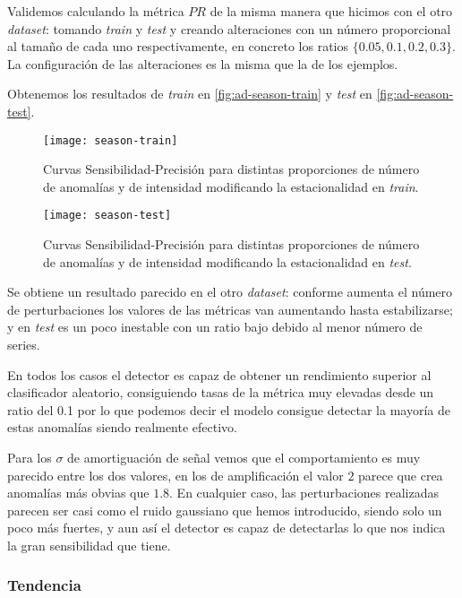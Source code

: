 Validemos calculando la métrica $PR$ de la misma manera que hicimos con el otro \emph{dataset}: tomando \emph{train} y \emph{test} y creando alteraciones con un número proporcional al tamaño de cada uno respectivamente, en concreto los ratios $\{0.05, 0.1, 0.2, 0.3\}$. La configuración de las alteraciones es la misma que la de los ejemplos.

Obtenemos los resultados de \emph{train} en \autoref{fig:ad-season-train} y \emph{test} en \autoref{fig:ad-season-test}.

\begin{figure}[htpb]
  \centering
  \texttt{[image: season-train]}
  \caption{Curvas Sensibilidad-Precisión para distintas proporciones de número de anomalías y de intensidad modificando la estacionalidad en \emph{train}.}
  \label{fig:ad-season-train}
\end{figure}

\begin{figure}[htpb]
  \centering
  \texttt{[image: season-test]}
  \caption{Curvas Sensibilidad-Precisión para distintas proporciones de número de anomalías y de intensidad modificando la estacionalidad en \emph{test}.}
  \label{fig:ad-season-test}
\end{figure}

Se obtiene un resultado parecido en el otro \emph{dataset}: conforme aumenta el número de perturbaciones los valores de las métricas van aumentando hasta estabilizarse; y en \emph{test} es un poco inestable con un ratio bajo debido al menor número de series.

En todos los casos el detector es capaz de obtener un rendimiento superior al clasificador aleatorio, consiguiendo tasas de la métrica muy elevadas desde un ratio del 0.1 por lo que podemos decir el modelo consigue detectar la mayoría de estas anomalías siendo realmente efectivo.

Para los $\sigma$ de amortiguación de señal vemos que el comportamiento es muy parecido entre los dos valores, en los de amplificación el valor $2$ parece que crea anomalías más obvias que $1.8$. En cualquier caso, las perturbaciones realizadas parecen ser casi como el ruido gaussiano que hemos introducido, siendo solo un poco más fuertes, y aun así el detector es capaz de detectarlas lo que nos indica la gran sensibilidad que tiene.

\subsubsection{Tendencia}

